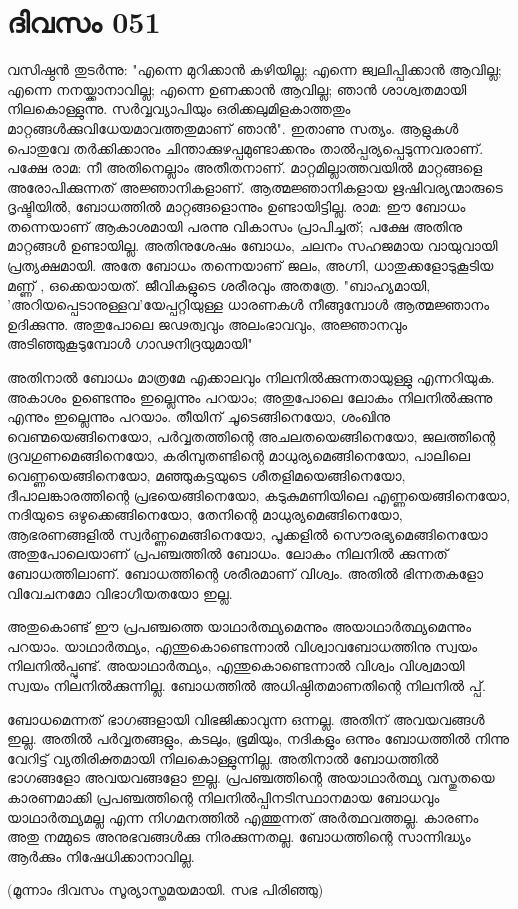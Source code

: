 \newpage
\section{ദിവസം 051}


വസിഷ്ഠന്‍ തുടര്‍ന്നു: "എന്നെ മുറിക്കാന്‍ കഴിയില്ല; എന്നെ ജ്വലിപ്പിക്കാന്‍ ആവില്ല; എന്നെ നനയ്ക്കാനാവില്ല; എന്നെ ഉണക്കാന്‍ ആവില്ല; ഞാന്‍ ശാശ്വതമായി നിലകൊള്ളുന്നു. സര്‍വ്വവ്യാപിയും ഒരിക്കലുമിളകാത്തതും മാറ്റങ്ങള്‍ക്കുവിധേയമാവത്തതുമാണ്‌ ഞാന്‍". ഇതാണു സത്യം. ആളുകള്‍ പൊതുവേ തര്‍ക്കിക്കാനും ചിന്താക്കുഴപ്പമുണ്ടാക്കനും താല്‍പ്പര്യപ്പെടുന്നവരാണ്‌. പക്ഷേ രാമ: നീ അതിനെല്ലാം അതീതനാണ്‌. മാറ്റമില്ലാത്തവയില്‍ മാറ്റങ്ങളെ അരോപിക്കുന്നത്‌ അജ്ഞാനികളാണ്‌. ആത്മജ്ഞാനികളായ ഋഷിവര്യന്മാരുടെ ദൃഷ്ടിയില്‍, ബോധത്തില്‍ മാറ്റങ്ങളൊന്നും ഉണ്ടായിട്ടില്ല. രാമ: ഈ ബോധം തന്നെയാണ്‌ ആകാശമായി പരന്നു വികാസം പ്രാപിച്ചത്‌; പക്ഷേ അതിനു മാറ്റങ്ങള്‍ ഉണ്ടായില്ല. അതിനുശേഷം ബോധം, ചലനം സഹജമായ വായുവായി പ്രത്യക്ഷമായി. അതേ ബോധം തന്നെയാണ്‌ ജലം, അഗ്നി, ധാതുക്കളോടുകൂടിയ മണ്ണ്‌ , ഒക്കെയായത്‌. ജീവികളുടെ ശരീരവും അതത്രേ. "ബാഹ്യമായി, 'അറിയപ്പെടാനുള്ളവ'യേപ്പറ്റിയുള്ള ധാരണകള്‍ നീങ്ങുമ്പോള്‍ ആത്മജ്ഞാനം ഉദിക്കുന്നു. അതുപോലെ ജഢത്വവും അലംഭാവവും, അജ്ഞാനവും അടിഞ്ഞുകൂടുമ്പോള്‍ ഗാഢനിദ്രയുമായി"

അതിനാല്‍ ബോധം മാത്രമേ എക്കാലവും നിലനില്‍ക്കുന്നതായുള്ളു എന്നറിയുക. അകാശം ഉണ്ടെന്നും ഇല്ലെന്നും പറയാം; അതുപോലെ ലോകം നിലനില്‍ക്കുന്നു എന്നും ഇല്ലെന്നും പറയാം. തീയിന്‌ ചൂടെങ്ങിനെയോ, ശംഖിനു വെണ്മയെങ്ങിനെയോ, പര്‍വ്വതത്തിന്റെ അചലതയെങ്ങിനെയോ, ജലത്തിന്റെ ദ്രവഗുണമെങ്ങിനെയോ, കരിമ്പുതണ്ടിന്റെ മാധുര്യമെങ്ങിനെയോ, പാലിലെ വെണ്ണയെങ്ങിനെയോ, മഞ്ഞുകട്ടയുടെ ശീതളിമയെങ്ങിനെയോ, ദീപാലങ്കാരത്തിന്റെ പ്രഭയെങ്ങിനെയോ, കടുകുമണിയിലെ എണ്ണയെങ്ങിനെയോ, നദിയുടെ ഒഴുക്കെങ്ങിനെയോ, തേനിന്റെ മാധുര്യമെങ്ങിനെയോ, ആഭരണങ്ങളില്‍ സ്വര്‍ണ്ണമെങ്ങിനെയോ, പൂക്കളില്‍ സൌരഭ്യമെങ്ങിനെയോ അതുപോലെയാണ്‌ പ്രപഞ്ചത്തില്‍ ബോധം. ലോകം നിലനില്‍ ക്കുന്നത്‌ ബോധത്തിലാണ്‌. ബോധത്തിന്റെ ശരീരമാണ്‌ വിശ്വം. അതില്‍ ഭിന്നതകളോ വിവേചനമോ വിഭാഗീയതയോ ഇല്ല.

അതുകൊണ്ട്‌ ഈ പ്രപഞ്ചത്തെ യാഥാര്‍ത്ഥ്യമെന്നും അയാഥാര്‍ത്ഥ്യമെന്നും പറയാം. യാഥാര്‍ത്ഥ്യം, എന്തുകൊണ്ടെന്നാല്‍ വിശ്വാവബോധത്തിനു സ്വയം നിലനില്‍പ്പുണ്ട്‌. അയാഥാര്‍ത്ഥ്യം, എന്തുകൊണ്ടെന്നാല്‍ വിശ്വം വിശ്വമായി സ്വയം നിലനില്‍ക്കുന്നില്ല. ബോധത്തില്‍ അധിഷ്ഠിതമാണതിന്റെ നിലനില്‍ പ്പ്‌.   

ബോധമെന്നത്‌ ഭാഗങ്ങളായി വിഭജിക്കാവുന്ന ഒന്നല്ല. അതിന്‌ അവയവങ്ങള്‍ ഇല്ല. അതില്‍ പര്‍വ്വതങ്ങളും, കടലും, ഭൂമിയും, നദികളും ഒന്നും ബോധത്തില്‍ നിന്നു വേറിട്ട്‌ വ്യതിരിക്തമായി നിലകൊള്ളുന്നില്ല. അതിനാല്‍ ബോധത്തില്‍ ഭാഗങ്ങളോ അവയവങ്ങളോ ഇല്ല. പ്രപഞ്ചത്തിന്റെ അയാഥാര്‍ത്ഥ്യ വസ്തുതയെ കാരണമാക്കി പ്രപഞ്ചത്തിന്റെ നിലനില്‍പ്പിനടിസ്ഥാനമായ ബോധവും യാഥാര്‍ത്ഥ്യമല്ല എന്ന നിഗമനത്തില്‍ എത്തുന്നത്‌ അര്‍ത്ഥവത്തല്ല. കാരണം അതു നമ്മുടെ അനുഭവങ്ങള്‍ക്കു നിരക്കുന്നതല്ല. ബോധത്തിന്റെ സാന്നിദ്ധ്യം ആര്‍ക്കും നിഷേധിക്കാനാവില്ല.

(മൂന്നാം ദിവസം സൂര്യാസ്തമയമായി. സഭ പിരിഞ്ഞു)

